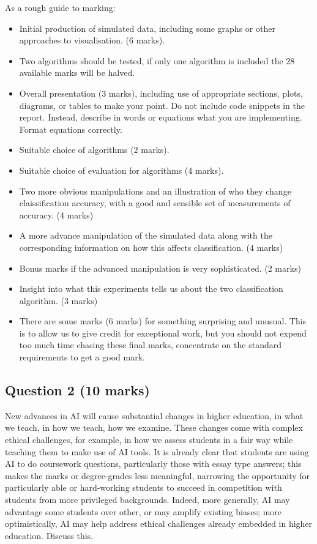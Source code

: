 \documentclass[12pt]{article}
\begin{document}
As a rough guide to marking:
\begin{itemize}
\item Initial production of simulated data, including some graphs or other approaches to visualisation. (6 marks).
\item Two algorithms should be tested, if only one algorithm is
  included the 28 available marks will be halved.
\item Overall presentation (3 marks), including use of appropriate
  sections, plots, diagrams, or tables to make your point. Do not
  include code snippets in the report. Instead, describe in words or
  equations what you are implementing. Format equations correctly.
\item Suitable choice of algorithms (2 marks).
\item Suitable choice of evaluation for algorithms (4 marks).
\item Two more obvious manipulations and an illustration of who they change claissification accuracy, with a good and sensible set of measurements of accuracy. (4 marks)
\item A more advance manipulation of the simulated data along with the corresponding information on how this affects classification. (4 marks)
\item Bonus marks if the advanced manipulation is very sophisticated. (2 marks)
\item Insight into what this experiments tells us about the two classification algorithm. (3 marks)
\item There are some marks (6 marks) for something surprising and
  unusual. This is to allow us to give credit for exceptional work,
  but you should not expend too much time chasing these final marks,
  concentrate on the standard requirements to get a good mark.
\end{itemize}

\subsection*{Question 2 (10 marks)}

New advances in AI will cause substantial changes in higher education,
in what we teach, in how we teach, how we examine. These changes come
with complex ethical challenges, for example, in how we assess
students in a fair way while teaching them to make use of AI tools. It
is already clear that students are using AI to do coursework
questions, particularly those with essay type answers; this makes the
marks or degree-grades less meaningful, narrowing the opportunity for
particularly able or hard-working students to succeed in competition
with students from more privileged backgrounds. Indeed, more
generally, AI may advantage some students over other, or may amplify
existing biases; more optimistically, AI may help address ethical
challenges already embedded in higher education. Discuss this.
\end{document}
